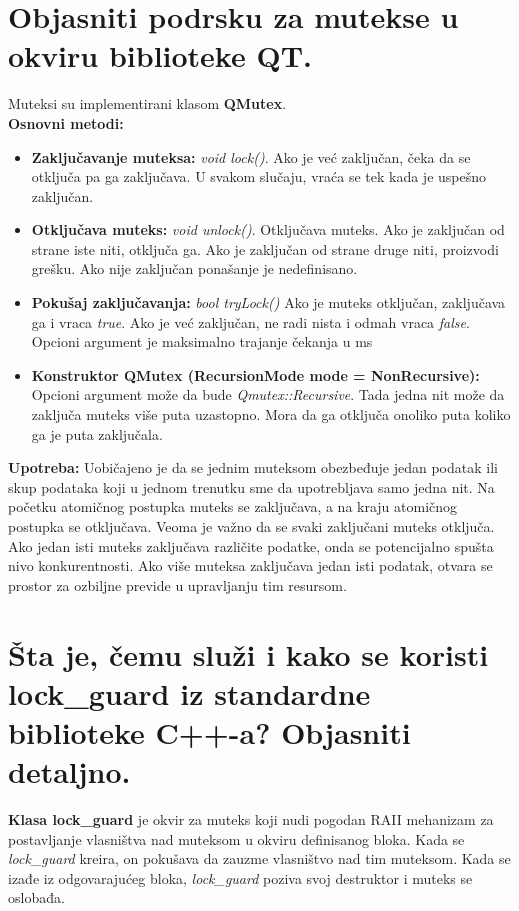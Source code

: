 \documentclass[a4paper]{article}
\begin{document}
  \section{Objasniti podrsku za mutekse u okviru biblioteke QT.}
  Muteksi su implementirani klasom \textbf{QMutex}. \\
  \noindent \textbf{Osnovni metodi:}
  \begin{itemize}
    \item \textbf{Zaključavanje muteksa:} \textit{void lock()}. Ako je već zaključan, 
          čeka da se otključa pa ga zaključava. U svakom slučaju, vraća se tek kada je 
          uspešno zaključan.
    \item \textbf{Otključava muteks:} \textit{void unlock()}. Otključava muteks. Ako je zaključan 
          od strane iste niti, otključa ga. Ako je zaključan od strane druge niti, proizvodi grešku.
          Ako nije zaključan ponašanje je nedefinisano.
    \item \textbf{Pokušaj zaključavanja:} \textit{bool tryLock()} Ako je muteks otključan, 
          zaključava ga i vraca \textit{true}. Ako je već zaključan, ne radi nista 
          i odmah vraca \textit{false}. Opcioni argument je maksimalno trajanje čekanja u ms
    \item \textbf{Konstruktor QMutex (RecursionMode mode = NonRecursive):} Opcioni argument može 
          da bude \textit{Qmutex::Recursive}. Tada jedna nit može da zaključa muteks više puta 
          uzastopno. Mora da ga otključa onoliko puta koliko ga je puta zaključala.
  \end{itemize}

  \textbf{Upotreba:} Uobičajeno je da se jednim muteksom obezbeđuje jedan podatak ili skup podataka 
  koji u jednom trenutku sme da upotrebljava samo jedna nit. Na početku atomičnog postupka muteks 
  se zaključava, a na kraju atomičnog postupka se otključava. Veoma je važno da se svaki 
  zaključani muteks otključa. Ako jedan isti muteks zaključava različite podatke, onda se 
  potencijalno spušta nivo konkurentnosti. Ako više muteksa zaključava jedan isti podatak, 
  otvara se prostor za ozbiljne previde u upravljanju tim resursom.


\section{Šta je, čemu služi i kako se koristi lock\_guard iz standardne biblioteke C++-a? 
         Objasniti detaljno.}
  \textbf{Klasa lock\_guard} je okvir za muteks koji nudi pogodan RAII mehanizam za postavljanje
  vlasništva nad muteksom u okviru definisanog bloka. Kada se \textit{lock\_guard} kreira,
  on pokušava da zauzme vlasništvo nad tim muteksom. Kada se izađe iz odgovarajućeg bloka, 
  \textit{lock\_guard} poziva svoj destruktor i muteks se oslobađa. \cite{cppref_lockguard}
\end{document}
